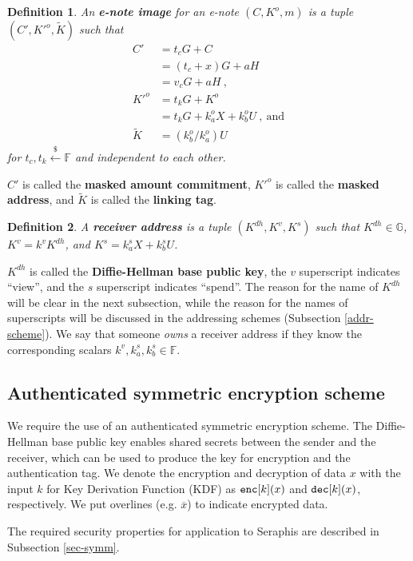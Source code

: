 \documentclass{article}
\theoremstyle{plain}
\newtheorem{definition}{Definition}[section]
\theoremstyle{remark}
\begin{document}
\begin{definition}\label{e-note-img}
An \textbf{\em e-note image} for an e-note $(C, K^o, m)$ is a tuple $(C', K'^o, \tilde{K})$ such that
\begin{align*}
C' &= t_c G + C \\ &= (t_c+x)G + aH \\ &= v_c G + aH \ , \\
K'^o &= t_k G + K^o \\ &= t_k G + k_a^o X + k_b^o U \ ,\ \text{and} \\
\tilde{K} &= (k_b^o/k_a^o)U
\end{align*}
for $t_c, t_k \xleftarrow{\$}\mathbb{F}$ and independent to each other.
\end{definition}
$C'$ is called the \textbf{masked amount commitment}, $K'^o$ is called the \textbf{masked address}, and $\tilde{K}$ is called the \textbf{linking tag}.

\begin{definition}\label{recv-addr}
A \textbf{\em receiver address} is a tuple $(K^{dh}, K^v, K^s)$  such that $K^{dh}\in\mathbb{G}$, $K^v = k^v K^{dh}$, and $K^s = k_a^s X + k_b^s U$.
\end{definition}
$K^{dh}$ is called the \textbf{Diffie-Hellman base public key}, the $v$ superscript indicates ``view'', and the $s$ superscript indicates ``spend''. The reason for the name of $K^{dh}$ will be clear in the next subsection, while the reason for the names of superscripts will be discussed in the addressing schemes (Subsection \ref{addr-scheme}). We say that someone \textit{owns} a receiver address if they know the corresponding scalars $k^v, k_a^s, k_b^s \in\mathbb{F}$.

\subsection{Authenticated symmetric encryption scheme}
We require the use of an authenticated symmetric encryption scheme. The Diffie-Hellman base public key enables shared secrets between the sender and the receiver, which can be used to produce the key for encryption and the authentication tag. We denote the encryption and decryption of data $x$ with the input $k$ for Key Derivation Function (KDF) as ${\tt enc}[k](x)$ and ${\tt dec}[k](x)$, respectively. We put overlines (e.g. $\overline{x}$) to indicate encrypted data.

The required security properties for application to Seraphis are described in Subsection \ref{sec-symm}.
\end{document}

